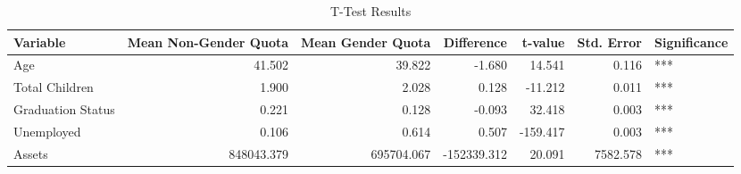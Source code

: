 \begin{table}

\caption{T-Test Results}
\centering
\begin{tabular}[t]{l|r|r|r|r|r|l}
\hline
\textbf{Variable} & \textbf{Mean Non-Gender Quota} & \textbf{Mean Gender Quota} & \textbf{Difference} & \textbf{t-value} & \textbf{Std. Error} & \textbf{Significance}\\
\hline
Age & 41.502 & 39.822 & -1.680 & 14.541 & 0.116 & ***\\
\hline
Total Children & 1.900 & 2.028 & 0.128 & -11.212 & 0.011 & ***\\
\hline
Graduation Status & 0.221 & 0.128 & -0.093 & 32.418 & 0.003 & ***\\
\hline
Unemployed & 0.106 & 0.614 & 0.507 & -159.417 & 0.003 & ***\\
\hline
Assets & 848043.379 & 695704.067 & -152339.312 & 20.091 & 7582.578 & ***\\
\hline
\end{tabular}
\end{table}
